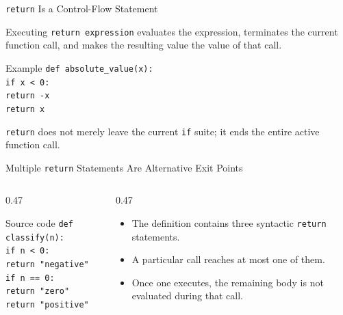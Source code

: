 \documentclass[aspectratio=169,10pt]{beamer}
\begin{document}
\begin{frame}{\texttt{return} Is a Control-Flow Statement}
  \begin{cpdefinition}
    Executing \texttt{return expression} evaluates the expression, terminates the current function call, and makes the resulting value the value of that call.
  \end{cpdefinition}

  \begin{block}{Example}
    \texttt{def absolute\_value(x):}\\
    \hspace*{0.20in}\texttt{if x < 0:}\\
    \hspace*{0.40in}\texttt{return -x}\\
    \hspace*{0.20in}\texttt{return x}
  \end{block}

  \begin{keyidea}
    \texttt{return} does not merely leave the current \texttt{if} suite; it ends the entire active function call.
  \end{keyidea}
\end{frame}

\begin{frame}{Multiple \texttt{return} Statements Are Alternative Exit Points}
  \begin{columns}[T,onlytextwidth]
    \begin{column}{0.47\textwidth}
      \begin{block}{Source code}
        \texttt{def classify(n):}\\
        \hspace*{0.20in}\texttt{if n < 0:}\\
        \hspace*{0.40in}\texttt{return "negative"}\\
        \hspace*{0.20in}\texttt{if n == 0:}\\
        \hspace*{0.40in}\texttt{return "zero"}\\
        \hspace*{0.20in}\texttt{return "positive"}
      \end{block}
    \end{column}

    \begin{column}{0.47\textwidth}
      \begin{itemize}
        \item The definition contains three syntactic \texttt{return} statements.
        \item A particular call reaches at most one of them.
        \item Once one executes, the remaining body is not evaluated during that call.
      \end{itemize}
    \end{column}
  \end{columns}
\end{frame}
\end{document}
